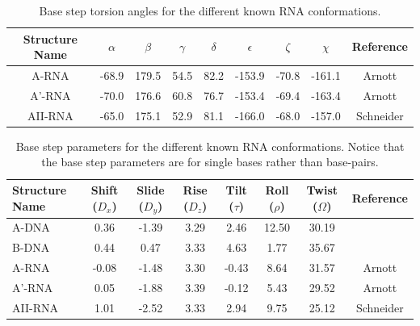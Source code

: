 \begin{table}[htbp]
\begin{center}
{\small
\begin{tabular}{c|c|c|c|c|c|c|c|c}
\hline
\bf{Structure Name} & $\alpha$ & $\beta$ & $\gamma$ & $\delta$ & $\epsilon$
& $\zeta$ & $\chi$ & \bf{Reference} \\ \hline
A-RNA & -68.9 & 179.5 & 54.5 & 82.2 & -153.9 & -70.8 & -161.1 & Arnott \\ \hline
A'-RNA & -70.0 & 176.6 & 60.8 & 76.7 & -153.4 & -69.4 & -163.4 & Arnott \\ \hline
AII-RNA & -65.0 & 175.1 & 52.9 & 81.1 & -166.0 & -68.0 & -157.0 & Schneider \\ \hline
\end{tabular}
}
\caption{Base step torsion angles for the different known RNA conformations.}
\label{tab:tor_conf}
\end{center}
\end{table}

\begin{table}[htbp]
\begin{center}
{\small
\begin{tabular}{p{2cm}|c|c|c|c|c|c|c}
\hline
\bf{Structure Name} & Shift ($D_x$) & Slide ($D_y$) & Rise ($D_z$) & Tilt
($\tau$) & Roll ($\rho$) & Twist ($\Omega$) & \bf{Reference} \\ \hline
A-DNA & 0.36 & -1.39 & 3.29 & 2.46 & 12.50 & 30.19 & \\ \hline
B-DNA & 0.44 & 0.47 & 3.33 & 4.63 & 1.77 & 35.67 & \\ \hline
A-RNA & -0.08 & -1.48 & 3.30 & -0.43 & 8.64 & 31.57 & Arnott \\ \hline
A'-RNA & 0.05 & -1.88 & 3.39 & -0.12 & 5.43 & 29.52 & Arnott \\ \hline
AII-RNA & 1.01 & -2.52 & 3.33 & 2.94 & 9.75 & 25.12 & Schneider \\ \hline
\end{tabular}
}
\caption{Base step parameters for the different known RNA
  conformations. Notice that the base step parameters are for single
  bases rather than base-pairs.}
\label{tab:step_conf}
\end{center}
\end{table}






